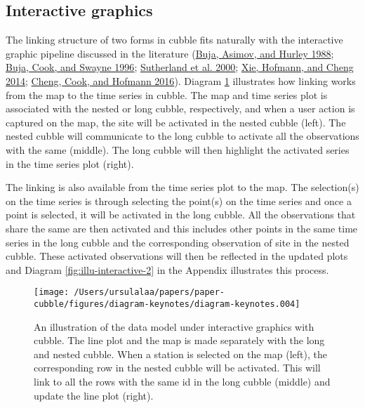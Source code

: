 \documentclass{article}
\begin{document}
\hypertarget{interactive-graphics}{%
\subsection{Interactive graphics}\label{interactive-graphics}}

The linking structure of two forms in cubble fits naturally with the interactive graphic pipeline discussed in the literature (\protect\hyperlink{ref-buja1988elements}{Buja, Asimov, and Hurley 1988}; \protect\hyperlink{ref-buja1996interactive}{Buja, Cook, and Swayne 1996}; \protect\hyperlink{ref-sutherland2000orca}{Sutherland et al. 2000}; \protect\hyperlink{ref-xie2014reactive}{Xie, Hofmann, and Cheng 2014}; \protect\hyperlink{ref-cheng2016enabling}{Cheng, Cook, and Hofmann 2016}). Diagram \ref{fig:illu-interactive} illustrates how linking works from the map to the time series in cubble. The map and time series plot is associated with the nested or long cubble, respectively, and when a user action is captured on the map, the site will be activated in the nested cubble (left). The nested cubble will communicate to the long cubble to activate all the observations with the same  (middle). The long cubble will then highlight the activated series in the time series plot (right).

The linking is also available from the time series plot to the map. The selection(s) on the time series is through selecting the point(s) on the time series and once a point is selected, it will be activated in the long cubble. All the observations that share the same  are then activated and this includes other points in the same time series in the long cubble and the corresponding observation of site in the nested cubble. These activated observations will then be reflected in the updated plots and Diagram \ref{fig:illu-interactive-2} in the Appendix illustrates this process.

\begin{figure}

{\centering \texttt{[image: /Users/ursulalaa/papers/paper-cubble/figures/diagram-keynotes/diagram-keynotes.004]} 

}

\caption{An illustration of the data model under interactive graphics with cubble. The line plot and the map is made separately with the long and nested cubble. When a station is selected on the map (left), the corresponding row in the nested cubble will be activated. This will link to all the rows with the same id in the long cubble (middle) and update the line plot (right).}\label{fig:illu-interactive}
\end{figure}
\end{document}
